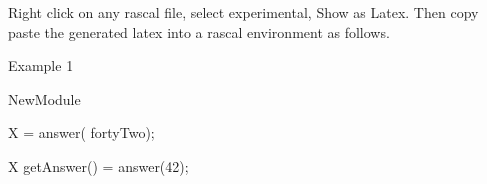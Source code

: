 \documentclass[]{article}
\begin{document}
Right click on any rascal file, select experimental, Show as Latex. Then copy paste the generated latex into a rascal environment as follows.
		
Example 1	
\begin{rascal}
	 NewModule

	 X = answer( fortyTwo);

	 X getAnswer() = answer(42);
\end{rascal}
	
\end{document}
